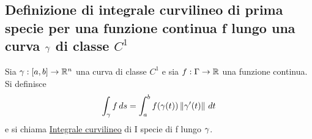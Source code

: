 \subsection{ Definizione di integrale curvilineo di prima specie per una funzione
continua f lungo una curva $\gamma$ di classe $C^1$}
\begin{definition}
  Sia $\gamma : [a,b]\to\mathbb{R}^n$ una curva di classe $C^1$ e sia $f:\Gamma \to \mathbb{R}$
  una funzione continua. Si definisce
  $$\int_{\gamma} f \,ds = \int_{a}^{b} f(\gamma(t))\left\lVert\gamma'(t)\right\rVert \,dt$$
  e si chiama \underline{Integrale curvilineo} di I specie di f lungo $\gamma$.
\end{definition}